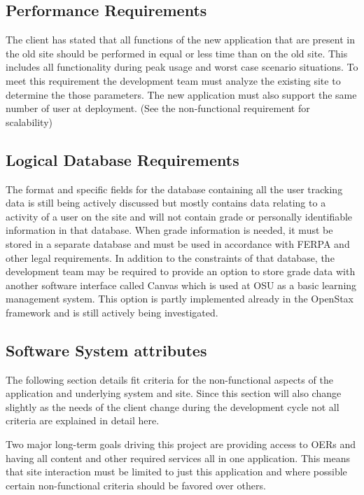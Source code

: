 \documentclass[onecolumn, draftclsnofoot,10pt, compsoc]{IEEEtran}
\begin{document}
\subsection{Performance Requirements}
The client has stated that all functions of the new application that are present in the old site should be performed in equal or less time than on the old site. This includes all functionality during peak usage and worst case scenario situations. To meet this requirement the development team must analyze the existing site to determine the those parameters. The new application must also support the same number of user at deployment. (See the non-functional requirement for scalability)

\subsection{Logical Database Requirements}
The format and specific fields for the database containing all the user tracking data is still being actively discussed but mostly contains data relating to a activity of a user on the site and will not contain grade or personally identifiable information in that database. When grade information is needed, it must be stored in a separate database and must be used in accordance with FERPA and other legal requirements. In addition to the constraints of that database, the development team may be required to provide an option to store grade data with another software interface called Canvas which is used at OSU as a basic learning management system. This option is partly implemented already in the OpenStax framework and is still actively being investigated. 

\subsection{Software System attributes}
The following section details fit criteria for the non-functional aspects of the application and underlying system and site. Since this section will also change slightly as the needs of the client change during the development cycle not all criteria are explained in detail here. 

Two major long-term goals driving this project are providing access to OERs and having all content and other required services all in one application. This means that site interaction must be limited to just this application and where possible certain non-functional criteria should be favored over others. 
\end{document}
